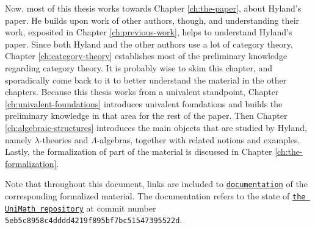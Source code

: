 Now, most of this thesis works towards Chapter \ref{ch:the-paper}, about Hyland's paper.
He builds upon work of other authors, though, and understanding their work, exposited in Chapter \ref{ch:previous-work}, helps to understand Hyland's paper.
Since both Hyland and the other authors use a lot of category theory, Chapter \ref{ch:category-theory} establishes most of the preliminary knowledge regarding category theory. It is probably wise to skim this chapter, and sporadically come back to it to better understand the material in the other chapters.
Because this thesis works from a univalent standpoint, Chapter \ref{ch:univalent-foundations} introduces univalent foundations and builds the preliminary knowledge in that area for the rest of the paper.
Then Chapter \ref{ch:algebraic-structures} introduces the main objects that are studied by Hyland, namely $ \lambda $-theories and $ \Lambda $-algebras, together with related notions and examples.
Lastly, the formalization of part of the material is discussed in Chapter \ref{ch:the-formalization}.

Note that throughout this document, links are included to \href{https://arnoudvanderleer.github.io/cs-masters-thesis/toc.html}{\nolinkurl{documentation}} of the corresponding formalized material. The documentation refers to the state of \href{https://github.com/UniMath/UniMath/tree/5eb5c8958c4dddd4219f895bf7bc51547395522d}{\nolinkurl{the UniMath repository}} at commit number \texttt{5eb5c8958c4dddd4219f895bf7bc51547395522d}.
